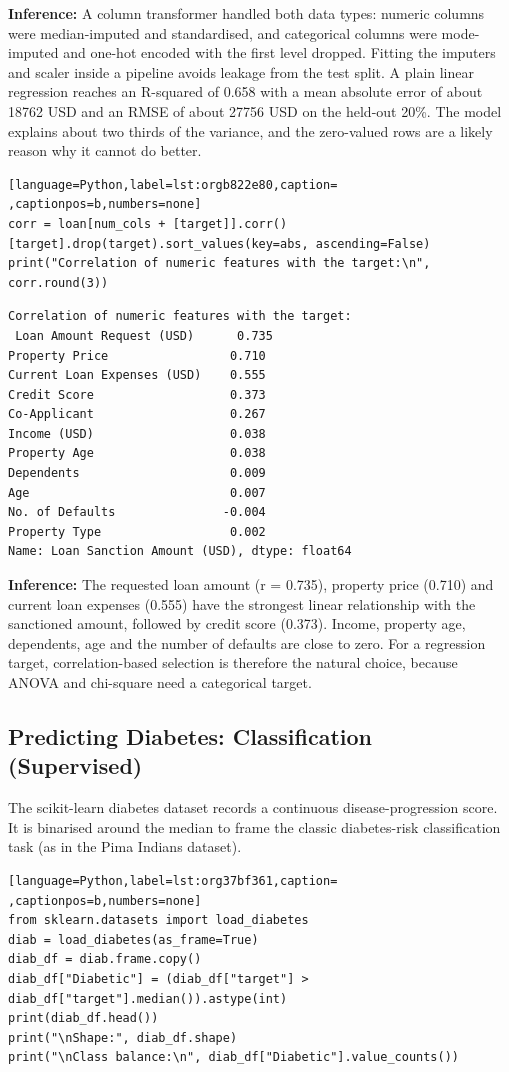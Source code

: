 \documentclass[11pt]{article}
\begin{document}
\textbf{Inference:} A column transformer handled both data types: numeric columns were median-imputed and
standardised, and categorical columns were mode-imputed and one-hot encoded with the first
level dropped. Fitting the imputers and scaler inside a pipeline avoids leakage from the
test split. A plain linear regression reaches an R-squared of 0.658 with a mean absolute
error of about 18762 USD and an RMSE of about 27756 USD on the held-out 20\%. The model
explains about two thirds of the variance, and the zero-valued rows are a likely reason why
it cannot do better.
\begin{lstlisting}[language=Python,label=lst:orgb822e80,caption= ,captionpos=b,numbers=none]
corr = loan[num_cols + [target]].corr()[target].drop(target).sort_values(key=abs, ascending=False)
print("Correlation of numeric features with the target:\n", corr.round(3))
\end{lstlisting}

\begin{verbatim}
Correlation of numeric features with the target:
 Loan Amount Request (USD)      0.735
Property Price                 0.710
Current Loan Expenses (USD)    0.555
Credit Score                   0.373
Co-Applicant                   0.267
Income (USD)                   0.038
Property Age                   0.038
Dependents                     0.009
Age                            0.007
No. of Defaults               -0.004
Property Type                  0.002
Name: Loan Sanction Amount (USD), dtype: float64
\end{verbatim}

\textbf{Inference:} The requested loan amount (r = 0.735), property price (0.710) and current loan expenses
(0.555) have the strongest linear relationship with the sanctioned amount, followed by
credit score (0.373). Income, property age, dependents, age and the number of defaults are
close to zero. For a regression target, correlation-based selection is therefore the natural
choice, because ANOVA and chi-square need a categorical target.

\subsection*{Predicting Diabetes: Classification (Supervised)}
\label{sec:org62e483e}


The scikit-learn diabetes dataset records a continuous disease-progression score. It is
binarised around the median to frame the classic diabetes-risk classification task (as in
the Pima Indians dataset).
\begin{lstlisting}[language=Python,label=lst:org37bf361,caption= ,captionpos=b,numbers=none]
from sklearn.datasets import load_diabetes
diab = load_diabetes(as_frame=True)
diab_df = diab.frame.copy()
diab_df["Diabetic"] = (diab_df["target"] > diab_df["target"].median()).astype(int)
print(diab_df.head())
print("\nShape:", diab_df.shape)
print("\nClass balance:\n", diab_df["Diabetic"].value_counts())
\end{lstlisting}
\end{document}
